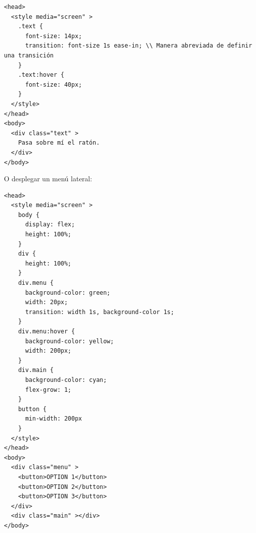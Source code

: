 {\begin{lstlisting}[style=htmlcssjs,frame=tlrb, xleftmargin={0.2cm}]
<head>
  <style media="screen" >
    .text {
      font-size: 14px;
      transition: font-size 1s ease-in; \\ Manera abreviada de definir una transición
    }
    .text:hover {
      font-size: 40px;
    }
  </style>
</head>
<body>
  <div class="text" >
    Pasa sobre mí el ratón.
  </div>
</body>
\end{lstlisting}}

O desplegar un menú lateral:

{\begin{lstlisting}[style=htmlcssjs,frame=tlrb, xleftmargin={0.2cm}]
<head>
  <style media="screen" >
    body {
      display: flex;
      height: 100%;
    }
    div {
      height: 100%;
    }
    div.menu {
      background-color: green;
      width: 20px;
      transition: width 1s, background-color 1s;
    }
    div.menu:hover {
      background-color: yellow;
      width: 200px;
    }
    div.main {
      background-color: cyan;
      flex-grow: 1;
    }
    button {
      min-width: 200px
    }
  </style>
</head>
<body>
  <div class="menu" >
    <button>OPTION 1</button>
    <button>OPTION 2</button>
    <button>OPTION 3</button>
  </div>
  <div class="main" ></div>
</body>
\end{lstlisting}}
